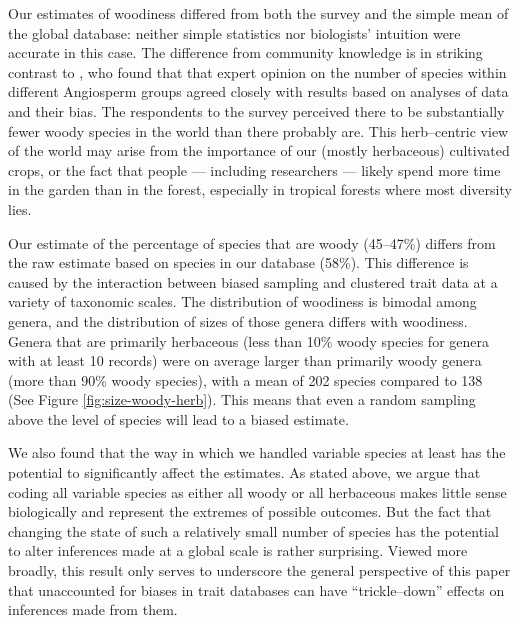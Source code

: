 \documentclass[a4paper,12pt]{article}
\begin{document}
Our estimates of woodiness differed from both the survey and the
simple mean of the global database: neither simple statistics nor
biologists' intuition were accurate in this case.  The difference from
community knowledge is in striking contrast to \citet{joppa2010}, who
found that that expert opinion on the number of species within
different Angiosperm groups agreed closely with results based on
analyses of data and their bias.
The respondents to the survey perceived there to be substantially fewer woody
species in the world than there probably are.  This herb--centric view
of the world may arise from the importance of our (mostly herbaceous)
cultivated crops, or the fact that people --- including researchers
--- likely spend more time in the garden than in the forest, especially in tropical forests where most diversity lies.

%
Our estimate of the percentage of species that are woody (45--47\%)
differs from the raw estimate based on species in our database (58\%).
This difference is caused by the interaction between biased sampling
and clustered trait data at a variety of taxonomic scales.
%
The distribution of woodiness is bimodal among genera, and the
distribution of sizes of those genera differs with woodiness.  Genera
that are primarily herbaceous (less than 10\% woody species for genera
with at least 10 records) were on average larger than primarily woody
genera (more than 90\% woody species), with a mean of 202 species
compared to 138 (See Figure \ref{fig:size-woody-herb}). 
This means that even a random sampling above the
level of species will lead to a biased estimate.

We also found that the way in which we handled variable species at least
has the potential to significantly affect the estimates.
As stated above, we argue that 
coding all variable species as either all woody or all herbaceous 
makes little sense biologically and represent the extremes of possible
outcomes. But the fact that changing the state of such a
relatively small number of species has the potential to 
alter inferences made at a global scale is rather surprising.
Viewed more broadly, this result only serves to underscore 
the general perspective of this paper that unaccounted for biases in 
trait databases can have ``trickle--down'' effects on inferences made from them.
\end{document}
